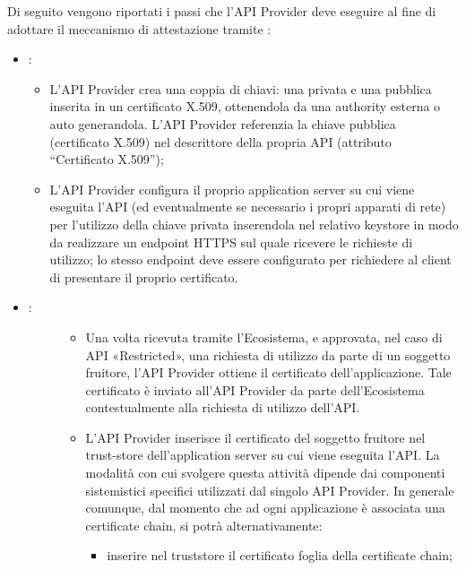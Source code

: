 \documentclass[letterpaper,10pt,italian]{sphinxmanual}
\begin{document}
Di seguito vengono riportati i passi che l’API Provider deve eseguire al fine di adottare il meccanismo di attestazione tramite :
\begin{itemize}
\item {} 
:
\begin{itemize}
\item {} 
L’API Provider crea una coppia di chiavi: una privata e una pubblica inserita in un certificato X.509, ottenendola da una authority esterna o auto generandola. L’API Provider referenzia la chiave pubblica (certificato X.509) nel descrittore della propria API (attributo “Certificato X.509”);

\item {} 
L’API Provider configura il proprio application server su cui viene eseguita l’API (ed eventualmente \textendash{} se necessario \textendash{} i propri apparati di rete) per l’utilizzo della chiave privata inserendola nel relativo keystore in modo da realizzare un endpoint HTTPS sul quale ricevere le richieste di utilizzo; lo stesso endpoint deve essere configurato per richiedere al client di presentare il proprio certificato.

\end{itemize}

\item {} \begin{description}
\item[{:}] \leavevmode\begin{itemize}
\item {} 
Una volta ricevuta tramite l’Ecosistema, e approvata, nel caso di API «Restricted», una richiesta di utilizzo da parte di un soggetto fruitore, l’API Provider ottiene il certificato dell’applicazione. Tale certificato è inviato all’API Provider da parte dell’Ecosistema contestualmente alla richiesta di utilizzo dell’API.

\item {} 
L’API Provider inserisce il certificato del soggetto fruitore nel trust-store dell’application server su cui viene eseguita l’API. La modalità con cui svolgere questa attività dipende dai componenti sistemistici specifici utilizzati dal singolo API Provider. In generale comunque, dal momento che ad ogni applicazione è associata una certificate chain, si potrà alternativamente:
\begin{itemize}
\item {} 
inserire nel truststore il certificato foglia della certificate chain;


\end{itemize}
\end{itemize}
\end{description}
\end{itemize}
\end{document}
